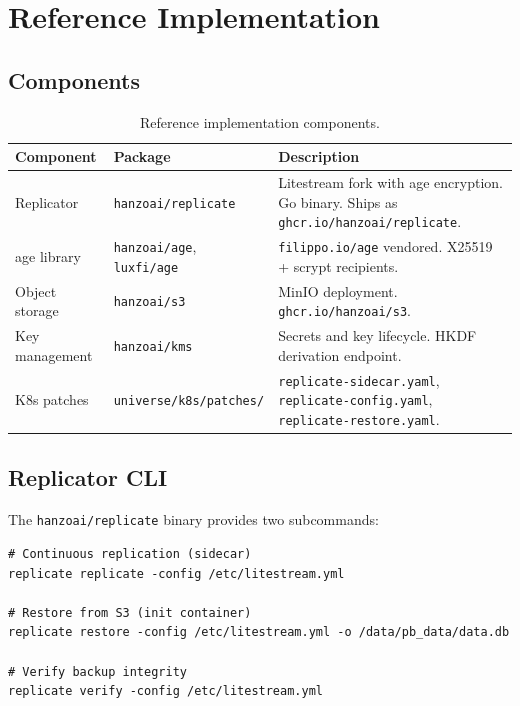 \section{Reference Implementation}
\label{sec:impl}

\subsection{Components}

\begin{table}[H]
\centering
\caption{Reference implementation components.}
\label{tab:components}
\begin{tabular}{@{}llp{6cm}@{}}
\toprule
\textbf{Component} & \textbf{Package} & \textbf{Description} \\
\midrule
Replicator & \texttt{hanzoai/replicate} & Litestream fork with age
  encryption. Go binary. Ships as
  \texttt{ghcr.io/hanzoai/replicate}. \\
age library & \texttt{hanzoai/age}, \texttt{luxfi/age} &
  \texttt{filippo.io/age} vendored. X25519 + scrypt recipients. \\
Object storage & \texttt{hanzoai/s3} & MinIO deployment.
  \texttt{ghcr.io/hanzoai/s3}. \\
Key management & \texttt{hanzoai/kms} & Secrets and key lifecycle.
  HKDF derivation endpoint. \\
K8s patches & \texttt{universe/k8s/patches/} &
  \texttt{replicate-sidecar.yaml},
  \texttt{replicate-config.yaml},
  \texttt{replicate-restore.yaml}. \\
\bottomrule
\end{tabular}
\end{table}

\subsection{Replicator CLI}

The \texttt{hanzoai/replicate} binary provides two subcommands:

\begin{lstlisting}[language={},caption={Replicator CLI usage.}]
# Continuous replication (sidecar)
replicate replicate -config /etc/litestream.yml

# Restore from S3 (init container)
replicate restore -config /etc/litestream.yml -o /data/pb_data/data.db

# Verify backup integrity
replicate verify -config /etc/litestream.yml
\end{lstlisting}

